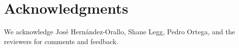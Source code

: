 \documentclass[runningheads]{llncs}
\begin{document}

\section*{Acknowledgments}

We acknowledge Jos{\'e} Hern{\'a}ndez-Orallo, Shane Legg, Pedro Ortega, and
the reviewers for comments and feedback.




\end{document}
